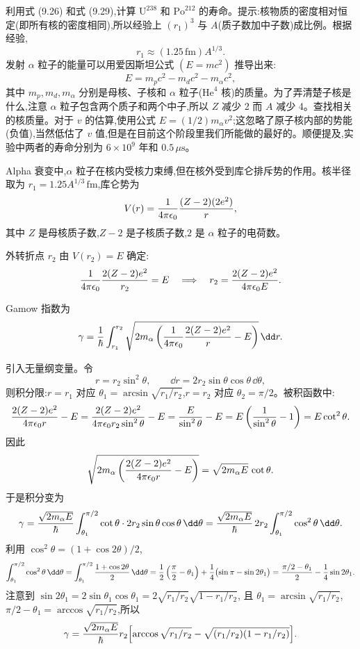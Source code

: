 \begin{question}
利用式 (9.26) 和式 (9.29),计算 $\mathrm U^{238}$ 和 $\mathrm{Po}^{212}$ 的寿命。提示:核物质的密度相对恒定(即所有核的密度相同),所以经验上 $(r_1)^3$ 与 $A$(质子数加中子数)成比例。根据经验,
\[
r_1\approx (1.25\,\mathrm{fm})A^{1/3}.
\]
发射 $\alpha$ 粒子的能量可以用爱因斯坦公式 $(E=mc^2)$ 推导出来:
\[
E=m_pc^2-m_dc^2-m_\alpha c^2,
\]
其中 $m_p,m_d,m_\alpha$ 分别是母核、子核和 $\alpha$ 粒子($\mathrm{He}^4$ 核)的质量。为了弄清楚子核是什么,注意 $\alpha$ 粒子包含两个质子和两个中子,所以 $Z$ 减少 2 而 $A$ 减少 4。查找相关的核质量。对于 $v$ 的估算,使用公式 $E=(1/2)m_\alpha v^2$;这忽略了原子核内部的势能(负值),当然低估了 $v$ 值,但是在目前这个阶段里我们所能做的最好的。顺便提及,实验中两者的寿命分别为 $6\times10^9$ 年和 $0.5\,\mu\mathrm{s}$。

\par\smallskip
{}

\begin{solution}
Alpha 衰变中,$\alpha$ 粒子在核内受核力束缚,但在核外受到库仑排斥势的作用。核半径取为 $r_1=1.25A^{1/3}\,\mathrm{fm}$,库仑势为
\[
V(r)={1\over4\pi\epsilon_0}{(Z-2)(2e^2)\over r},
\]
其中 $Z$ 是母核质子数,$Z-2$ 是子核质子数,$2$ 是 $\alpha$ 粒子的电荷数。

外转折点 $r_2$ 由 $V(r_2)=E$ 确定:
\[
{1\over4\pi\epsilon_0}{2(Z-2)e^2\over r_2}=E
\quad\Longrightarrow\quad
r_2={2(Z-2)e^2\over4\pi\epsilon_0 E}.
\]

Gamow 指数为
\[
\gamma={1\over\hbar}\int_{r_1}^{r_2}
\sqrt{2m_\alpha\left({1\over4\pi\epsilon_0}{2(Z-2)e^2\over r}-E\right)}\,\dd r.
\]

引入无量纲变量。令
\[
r=r_2\sin^2\theta,
\qquad\dd r=2r_2\sin\theta\cos\theta\,\dd\theta,
\]
则积分限:$r=r_1$ 对应 $\theta_1=\arcsin\sqrt{r_1/r_2}$,$r=r_2$ 对应 $\theta_2=\pi/2$。被积函数中:
\[
{2(Z-2)e^2\over4\pi\epsilon_0 r}-E
={2(Z-2)e^2\over4\pi\epsilon_0 r_2\sin^2\theta}-E
={E\over\sin^2\theta}-E
=E\left({1\over\sin^2\theta}-1\right)
=E\cot^2\theta.
\]
因此
\[
\sqrt{2m_\alpha\left({2(Z-2)e^2\over4\pi\epsilon_0 r}-E\right)}
=\sqrt{2m_\alpha E}\,\cot\theta.
\]
于是积分变为
\[
\gamma={\sqrt{2m_\alpha E}\over\hbar}
\int_{\theta_1}^{\pi/2}\cot\theta\cdot 2r_2\sin\theta\cos\theta\,\dd\theta
={\sqrt{2m_\alpha E}\over\hbar}\,2r_2
\int_{\theta_1}^{\pi/2}\cos^2\theta\,\dd\theta.
\]
利用 $\cos^2\theta=(1+\cos2\theta)/2$,
\[
\int_{\theta_1}^{\pi/2}\cos^2\theta\,\dd\theta
=\int_{\theta_1}^{\pi/2}{1+\cos2\theta\over2}\,\dd\theta
={1\over2}\left({\pi\over2}-\theta_1\right)
+{1\over4}\bigl(\sin\pi-\sin2\theta_1\bigr)
={\pi/2-\theta_1\over2}-{1\over4}\sin2\theta_1.
\]
注意到 $\sin2\theta_1=2\sin\theta_1\cos\theta_1=2\sqrt{r_1/r_2}\sqrt{1-r_1/r_2}$,
且 $\theta_1=\arcsin\sqrt{r_1/r_2}$,$\pi/2-\theta_1=\arccos\sqrt{r_1/r_2}$,所以
\[
\gamma={\sqrt{2m_\alpha E}\over\hbar}r_2
\Bigl[\arccos\sqrt{r_1/r_2}-\sqrt{(r_1/r_2)(1-r_1/r_2)}\Bigr].
\]


\end{solution}
\end{question}
